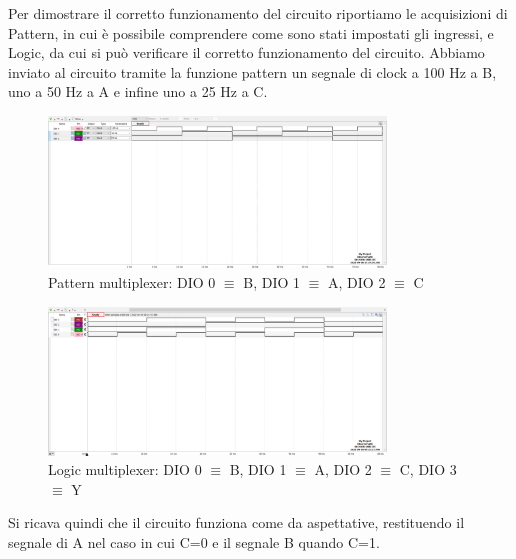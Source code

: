 \documentclass[10pt, a4paper, italian]{article}
\begin{document}
Per dimostrare il corretto funzionamento del circuito riportiamo le acquisizioni di Pattern, in cui è possibile comprendere come sono stati impostati gli ingressi, e Logic, da cui si può verificare il corretto funzionamento del circuito.
Abbiamo inviato al circuito tramite la funzione pattern un segnale di clock a 100 Hz a B, uno a 50 Hz a A e infine uno a 25 Hz a C.
\begin{figure}[htbp]
    \centering
    \includegraphics[width=0.8\textwidth]{pat2.png}
    \caption{\label{pattern2}Pattern multiplexer: DIO 0 $\equiv$ B, DIO 1 $\equiv$ A, DIO 2 $\equiv$ C}
    
\end{figure}
\begin{figure}[htbp]
    \centering
    \includegraphics[width=0.8\textwidth]{Multiplex.png}
    \caption{\label{logic2}Logic multiplexer: DIO 0 $\equiv$ B, DIO 1 $\equiv$ A, DIO 2 $\equiv$ C, DIO 3 $\equiv$ Y}
    
\end{figure}
Si ricava quindi che il circuito funziona come da aspettative, restituendo il segnale di A nel caso in cui C=0 e il segnale B quando C=1.
\end{document}
